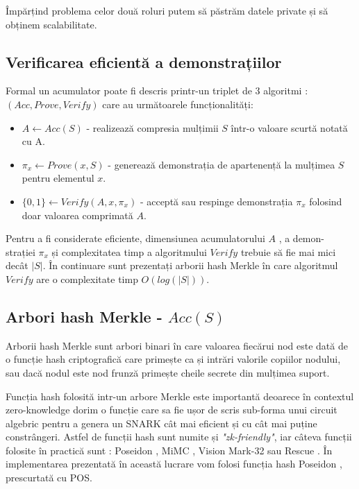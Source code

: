\documentclass[12pt, letterpaper]{article}
\begin{document}
Împărțind problema celor două roluri putem să păstrăm datele private și să obținem scalabilitate.

\subsection{Verificarea eficientă a demonstrațiilor}

Formal un acumulator poate fi descris printr-un triplet de 3 algoritmi : $(Acc,Prove,Verify)$ care au următoarele funcționalități:
\begin{itemize}
    \item{\textbf{$A \leftarrow Acc(S)$} - realizează compresia mulțimii $S$ într-o valoare scurtă notată cu A.}
    \item{\textbf{ $\pi_x \leftarrow Prove(x,S)$} - generează demonstrația de apartenență la mulțimea $S$ pentru elementul $x$.}
    \item{\textbf{ $\{0,1\} \leftarrow Verify(A,x,\pi_x)$} - acceptă sau respinge demonstrația $\pi_x$ folosind doar valoarea comprimată $A$.}
\end{itemize}

Pentru a fi considerate eficiente, dimensiunea acumulatorului $A$ , a demon-
strației $\pi_x$ și complexitatea timp a algoritmului $Verify$ trebuie să fie mai mici decât $|S|$. În continuare sunt prezentați arborii hash Merkle în care algoritmul $Verify$ are o complexitate timp $O(log(|S|))$. 

\subsection{Arbori hash Merkle - $Acc(S)$}
Arborii hash Merkle sunt arbori binari în care valoarea fiecărui nod este dată de o funcție hash criptografică care primește ca și intrări valorile copiilor nodului, sau dacă nodul este nod frunză primește cheile secrete din mulțimea suport. 

Funcția hash folosită intr-un arbore Merkle este importantă deoarece în contextul zero-knowledge dorim o funcție care sa fie ușor de scris sub-forma unui circuit algebric pentru a genera un SNARK cât mai eficient și cu cât mai puține constrângeri. Astfel de funcții hash sunt numite și \emph{"zk-friendly"}, iar câteva funcții folosite în practică sunt  : Poseidon \cite{cryptoeprint:2019/458} , MiMC \cite{cryptoeprint:2016/492} , Vision Mark-32 \cite{cryptoeprint:2024/633} sau Rescue \cite{cryptoeprint:2022/1577}. În implementarea prezentată în această lucrare vom folosi funcția hash Poseidon , prescurtată cu POS.
\end{document}
